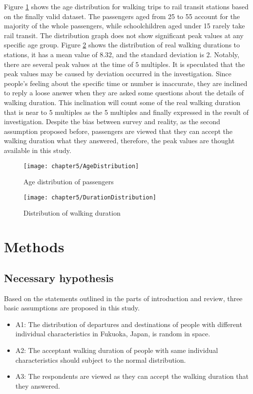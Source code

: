 %
Figure \ref{fig:chp2:AgeDistribution} shows the age distribution for walking trips to rail transit stations based on the finally valid dataset. The passengers aged from 25 to 55 account for the majority of the whole passengers, while schoolchildren aged under 15 rarely take rail transit. The distribution graph does not show significant peak values at any specific age group. Figure \ref{fig:chp2:DurationDistribution} shows the distribution of real walking durations to stations, it has a mean value of 8.32, and the standard deviation is 2. Notably, there are several peak values at the time of 5 multiples. It is speculated that the peak values may be caused by deviation occurred in the investigation. Since people's feeling about the specific time or number is inaccurate, they are inclined to reply a loose answer when they are asked some questions about the details of walking duration. This inclination will count some of the real walking duration that is near to 5 multiples as the 5 multiples and finally expressed in the result of investigation. Despite the bias between survey and reality, as the second assumption proposed before, passengers are viewed that they can accept the walking duration what they answered, therefore, the peak values are thought available in this study.

\begin{figure}[htbp]
	\centering
	\texttt{[image: chapter5/AgeDistribution]}
	\caption{Age distribution of passengers}
	\label{fig:chp2:AgeDistribution}
\end{figure}

\begin{figure}[htbp]
	\centering
	\texttt{[image: chapter5/DurationDistribution]}
	\caption{Distribution of walking duration}
	\label{fig:chp2:DurationDistribution}
\end{figure}

%
\section{Methods}
%
\subsection{Necessary hypothesis}
Based on the statements outlined in the parts of introduction and review, three basic assumptions are proposed in this study.

\begin{itemize}
	\setlength{\parskip}{0\baselineskip} %
	\item A1: The distribution of departures and destinations of people with different individual characteristics in Fukuoka, Japan, is random in space. 
	\item A2: The acceptant walking duration of people with same individual characteristics should subject to the normal distribution. 
	\item A3: The respondents are viewed as they can accept the walking duration that they answered.
	\setlength{\parskip}{0.7\baselineskip} %
\end{itemize}

